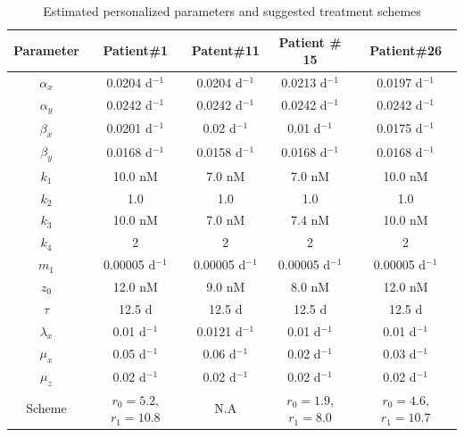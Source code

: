 \begin{table}[t]
\caption{Estimated personalized parameters and suggested treatment schemes \label{prostate2}}
\centering
\small
\begin{tabular}{|c|c|c|c|c|}
\hline\hline
Parameter  & Patient\#1 & Patent\#11 & Patient \# 15 & Patient\#26  \\\hline\hline
$\alpha_x$ & 0.0204 d$^{-1}$ & 0.0204 d$^{-1}$ & 0.0213 d$^{-1}$& 0.0197 d$^{-1}$ \\
$\alpha_y$ & 0.0242 d$^{-1}$ &  0.0242 d$^{-1}$&  0.0242 d$^{-1}$&  0.0242 d$^{-1}$  \\
$\beta_x$  & 0.0201 d$^{-1}$ & 0.02 d$^{-1}$ & 0.01 d$^{-1}$& 0.0175 d$^{-1}$ \\
$\beta_y$  & 0.0168 d$^{-1}$ &0.0158 d$^{-1}$ &0.0168 d$^{-1}$ &0.0168 d$^{-1}$  \\
$k_1$     & 10.0 nM & 7.0 nM & 7.0 nM& 10.0 nM  \\
$k_2$     & 1.0 & 1.0 & 1.0 & 1.0 \\
$k_3$     & 10.0 nM & 7.0 nM & 7.4 nM& 10.0 nM  \\
$k_4$     &  2 & 2 & 2 & 2   \\
$m_1$     & 0.00005 d$^{-1}$ &  0.00005 d$^{-1}$ &  0.00005 d$^{-1}$ &  0.00005 d$^{-1}$  \\
$z_0$     & 12.0 nM & 9.0 nM & 8.0 nM & 12.0 nM  \\
$\tau$     & 12.5 d & 12.5 d & 12.5 d & 12.5 d  \\
$\lambda_x$     & 0.01 d$^{-1}$ & 0.0121 d$^{-1}$ & 0.01 d$^{-1}$ & 0.01 d$^{-1}$ \\
$\mu_x$     & 0.05 d$^{-1}$ & 0.06 d$^{-1}$ & 0.02 d$^{-1}$ & 0.03 d$^{-1}$\\
$\mu_z$     & 0.02 d$^{-1}$ & 0.02 d$^{-1}$  & 0.02 d$^{-1}$ & 0.02 d$^{-1}$  \\
\hline\hline
Scheme     & $r_0=5.2$, $r_1=10.8$ & N.A & $r_0=1.9$, $r_1=8.0$ & $r_0=4.6$, $r_1=10.7$ \\
\hline\hline
\end{tabular}
\end{table}



